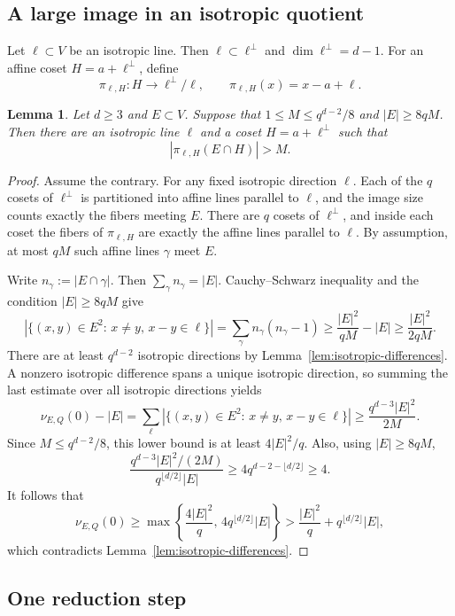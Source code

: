\documentclass[11pt]{article}
\newtheorem{lemma}[theorem]{Lemma}
\theoremstyle{remark}
\numberwithin{equation}{section}
\newcommand{\1}{\mathbf 1}
\begin{document}
\subsection{A large image in an isotropic quotient}

Let \(\ell\subset V\) be an isotropic line. Then $\ell\subset\ell^\perp$ and $\dim\ell^\perp=d-1$. For an affine coset \(H=a+\ell^\perp\), define
\[
 \pi_{\ell,H}:H\longrightarrow \ell^\perp/\ell,
 \qquad
 \pi_{\ell,H}(x)=x-a+\ell.
\]

\begin{lemma}\label{lem:large-projection}
Let \(d\ge3\) and \(E\subset V\). Suppose that $1\le M\le q^{d-2}/8$ and $|E|\ge8qM$. Then there are an isotropic line \(\ell\) and a coset \(H=a+\ell^\perp\) such that
\[
        |\pi_{\ell,H}(E\cap H)|>M.
\]
\end{lemma}

\begin{proof}
Assume the contrary. For any fixed  isotropic direction \(\ell\). Each of the $q$ cosets of $\ell^\perp$ is partitioned
into affine lines parallel to $\ell$, and the image size counts exactly the fibers meeting $E$. There are \(q\) cosets of \(\ell^\perp\), and inside each coset the fibers of \(\pi_{\ell,H}\) are exactly the affine lines parallel to \(\ell\). By assumption, at most \(qM\) such affine lines $\gamma$ meet \(E\).

Write \(n_\gamma:=|E\cap\gamma|\). Then $\sum_\gamma n_\gamma = |E|$. Cauchy--Schwarz inequality and the condition \(|E|\ge8qM\) give
\[
|\{(x,y)\in E^2:\, x\neq y, \, x-y\in \ell\}| = \sum_\gamma n_\gamma(n_\gamma-1)
 \ge \frac{|E|^2}{qM}-|E|
 \ge \frac{|E|^2}{2qM}.
\]
There are at least \(q^{d-2}\) isotropic directions by Lemma~\ref{lem:isotropic-differences}. A nonzero isotropic difference
spans a unique isotropic direction, so summing the last estimate over all isotropic directions yields
\[
\nu_{E,Q}(0)-|E| = \sum_\ell |\{(x,y)\in E^2:\, x\neq y, \, x-y\in \ell\}| \ge \frac{q^{d-3}|E|^2}{2M}.
\]
Since \(M\le q^{d-2}/8\), this lower bound is at least \(4|E|^2/q\). Also, using \(|E|\ge8qM\), 
\[
 \frac{q^{d-3}|E|^2/(2M)}{q^{\lfloor d/2\rfloor}|E|}
 \ge4q^{d-2-\lfloor d/2\rfloor}\ge4.
\]
It follows that 
\[
\nu_{E,Q}(0)\geq \max\left\{\frac{4|E|^2}{q},\, 4q^{\lfloor d/2\rfloor}|E|\right\}>\frac{|E|^2}{q}+q^{\lfloor d/2\rfloor}|E|,
\]
which contradicts Lemma~\ref{lem:isotropic-differences}.
\end{proof}

\subsection{One reduction step}
\end{document}
